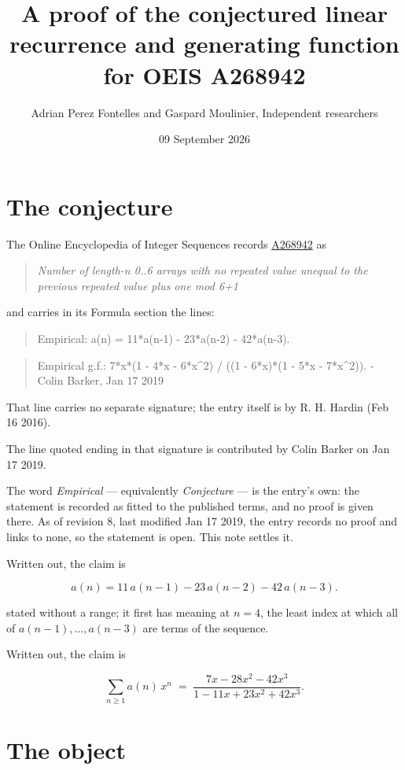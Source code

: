 \documentclass[11pt]{article}
\title{A proof of the conjectured linear recurrence and generating function for OEIS A268942}
\author{Adrian Perez Fontelles and Gaspard Moulinier, Independent researchers}
\date{09 September 2026}
\theoremstyle{definition}
\begin{document}
\maketitle
\section{The conjecture}

The Online Encyclopedia of Integer Sequences records \href{https://oeis.org/A268942}{A268942} as

\begin{quote}\itshape Number of length-n 0..6 arrays with no repeated value unequal to the previous repeated value plus one mod 6+1\end{quote}

and carries in its Formula section the lines:

\begin{quote}\ttfamily Empirical: a(n) = 11*a(n-1) - 23*a(n-2) - 42*a(n-3).\end{quote}

\begin{quote}\ttfamily Empirical g.f.: 7*x*(1 - 4*x - 6*x\textasciicircum{}2) / ((1 - 6*x)*(1 - 5*x - 7*x\textasciicircum{}2)). - Colin Barker, Jan 17 2019\end{quote}

That line carries no separate signature; the entry itself is by R. H. Hardin (Feb 16 2016).

The line quoted ending in that signature is contributed by Colin Barker on Jan 17 2019.

The word {\itshape Empirical} --- equivalently {\itshape Conjecture} --- is the entry's own: the statement is recorded as fitted to the published terms, and no proof is given there. As of revision 8, last modified Jan 17 2019, the entry records no proof and links to none, so the statement is open. This note settles it.

Written out, the claim is

\[a(n) = 11\,a(n-1) - 23\,a(n-2) - 42\,a(n-3).\]

stated without a range; it first has meaning at $n = 4$, the least index at which all of $a(n-1),\dots,a(n-3)$ are terms of the sequence.

Written out, the claim is

\[\sum_{n \ge 1} a(n)\,x^n \;=\; \frac{7x - 28x^{2} - 42x^{3}}{1 - 11x + 23x^{2} + 42x^{3}}.\]

\section{The object}
\end{document}
